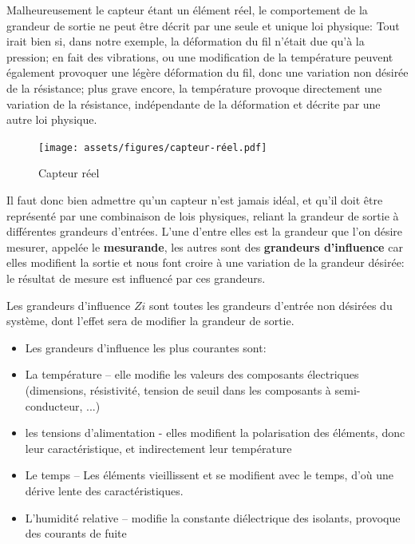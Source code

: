 Malheureusement le capteur étant un élément réel, le comportement de la grandeur de sortie ne peut être décrit par une seule et unique loi physique: Tout irait bien si, dans notre exemple, la déformation du fil n'était due qu'à la pression; en fait des vibrations, ou une modification de la température peuvent également provoquer une légère déformation du fil, donc une variation non désirée de la résistance; plus grave encore, la température provoque directement une variation de la résistance, indépendante de la déformation et décrite par une autre loi physique.
\begin{figure}
   \centering
   \texttt{[image: assets/figures/capteur-réel.pdf]}
   \caption{Capteur réel}
   \label{fig:Grandeur_Influence}
\end{figure}

Il faut donc bien admettre qu'un capteur n'est jamais idéal, et qu'il doit être représenté par une combinaison de lois physiques, reliant la grandeur de sortie à différentes grandeurs d'entrées. L'une d'entre elles est la grandeur que l'on désire mesurer, appelée le \textbf{mesurande}, les autres sont des \textbf{grandeurs d'influence} car elles modifient la sortie et nous font croire à une variation de la grandeur désirée: le résultat de mesure est influencé par ces grandeurs.

\begin{definition}
Les grandeurs d'influence $Zi$ sont toutes les grandeurs d'entrée non désirées du système, dont l'effet sera de modifier la grandeur de sortie.
\end{definition}

\begin{itemize}
    \item Les grandeurs d'influence les plus courantes sont:
    \item La température -- elle modifie les valeurs des composants électriques (dimensions, résistivité, tension de seuil dans les composants à semi-conducteur, ...)
    \item les tensions d'alimentation - elles modifient la polarisation des éléments, donc leur caractéristique, et indirectement leur température
    \item Le temps -- Les éléments vieillissent et se modifient avec le temps, d'où une dérive lente des caractéristiques.
    \item L'humidité relative -- modifie la constante diélectrique des isolants, provoque des courants de fuite
\end{itemize}

